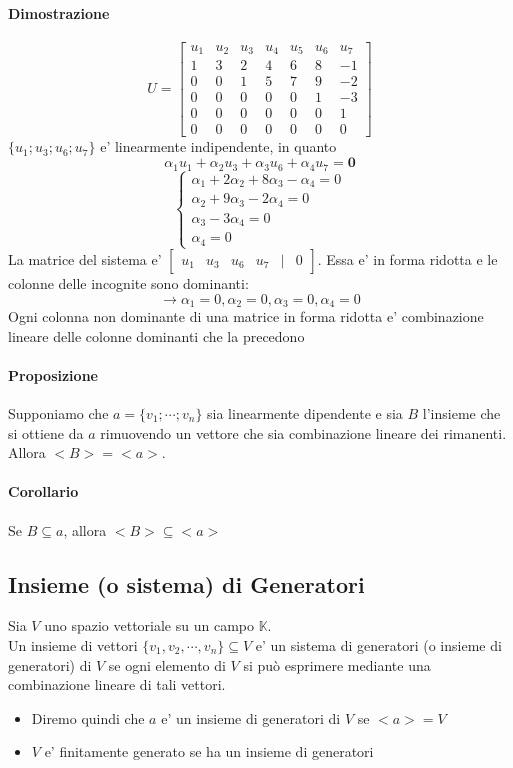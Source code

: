 \documentclass[a4paper, 10pt]{article}
\begin{document}
	\paragraph*{Dimostrazione}
		  \[ U = \begin{bmatrix}
		  	u_1 & u_2 & u_3 & u_4 & u_5 & u_6 & u_7 \\
		  	1 & 3 & 2 & 4 & 6 & 8 & -1 \\
		  	0 & 0 & 1 & 5 & 7 & 9 & -2 \\
		  	0 & 0 & 0 & 0 & 0 & 1 & -3 \\
		  	0 & 0 & 0 & 0 & 0 & 0 & 1 \\
		  	0 & 0 & 0 & 0 & 0 & 0 & 0
		  \end{bmatrix} \]
		  $\lbrace u_1; u_3; u_6; u_7 \rbrace$ e' linearmente indipendente, in quanto 
		  \[ \alpha_1 u_1 + \alpha_2 u_3 + \alpha_3 u_6 + \alpha_4 u_7 = \textbf{0} \]
		  \[
		  \begin{cases}
		  	\alpha_1 + 2\alpha_2 + 8\alpha_3 - \alpha_4 = 0 \\
		  	\alpha_2 + 9\alpha_3 - 2\alpha_4 = 0 \\
		  	\alpha_3 - 3\alpha_4 = 0 \\ 
		  	\alpha_4 = 0
		  \end{cases}
		  \]
		  La matrice del sistema e' $ \begin{bmatrix}u_1 & u_3 & u_6 & u_7 & | & 0 \end{bmatrix}$. Essa e' in forma 
		  ridotta e le colonne delle incognite sono dominanti: 
		  \[ \rightarrow \alpha_1 = 0 , \alpha_2 = 0, \alpha_3 = 0, \alpha_4 = 0 \]
		  Ogni colonna non dominante di una matrice in forma ridotta e' combinazione lineare delle colonne dominanti 
		  che la precedono
	\paragraph*{Proposizione} Supponiamo che $a = \lbrace v_1; \cdots ; v_n \rbrace$ sia linearmente dipendente e 
							 sia $B$ l'insieme che si ottiene da $a$ rimuovendo un vettore che sia combinazione lineare 
							 dei rimanenti. Allora $<B> = <a>$.
	\paragraph*{Corollario} Se $B \subseteq a$, allora $<B> \subseteq <a>$
	
	
	\subsection{Insieme (o sistema) di Generatori}
	Sia $V$ uno spazio vettoriale su un campo $\mathbb{K}$.\\ Un insieme di vettori $\lbrace v_1, v_2, \cdots, v_n 
	\rbrace \subseteq V$ e' un sistema di generatori (o insieme di generatori) di $V$ se ogni elemento di $V$ si può
	esprimere mediante una combinazione lineare di tali vettori. 
	\begin{itemize}
		\item Diremo quindi che $a$ e' un insieme di generatori di $V$ se $<a> = V$
		\item $V$ e' finitamente generato se ha un insieme di generatori
	\end{itemize}
	
\end{document}
